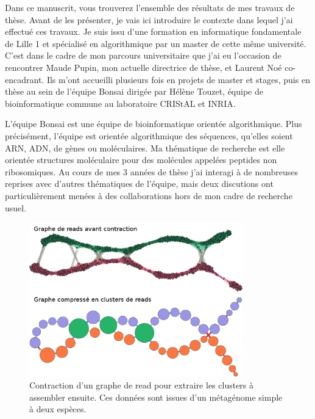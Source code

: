 Dans ce manuscrit, vous trouverez l'ensemble des résultats de mes travaux de thèse.
Avant de les présenter, je vais ici introduire le contexte dans lequel j'ai effectué ces travaux.
Je suis issu d'une formation en informatique fondamentale de Lille 1 et spécialisé en algorithmique par un master de cette même université.
C'est dans le cadre de mon parcours universitaire que j'ai eu l'occasion de rencontrer Maude Pupin, mon actuelle directrice de thèse, et Laurent Noé co-encadrant.
Ils m'ont accueilli plusieurs fois en projets de master et stages, puis en thèse au sein de l'équipe Bonsai dirigée par Hélène Touzet, équipe de bioinformatique commune au laboratoire CRIStAL et INRIA.

L'équipe Bonsai est une équipe de bioinformatique orientée algorithmique.
Plus précisément, l'équipe est orientée algorithmique des séquences, qu'elles soient ARN, ADN, de gènes ou moléculaires.
Ma thématique de recherche est elle orientée structures moléculaire pour des molécules appelées peptides non ribosomiques.
Au cours de mes 3 années de thèse j'ai interagi à de nombreuses reprises avec d'autres thématiques de l'équipe, mais deux discutions ont particulièrement menées à des collaborations hors de mon cadre de recherche usuel.

\begin{figure}[!ht]
  \begin{center}
    \includegraphics[width=350px]{Figures/preambule/pierre.png}
    \caption{\label{pierre}Contraction d'un graphe de read pour extraire les clusters à assembler ensuite.
    Ces données sont issues d'un métagénome simple à deux espèces.}
  \end{center}
\end{figure}

